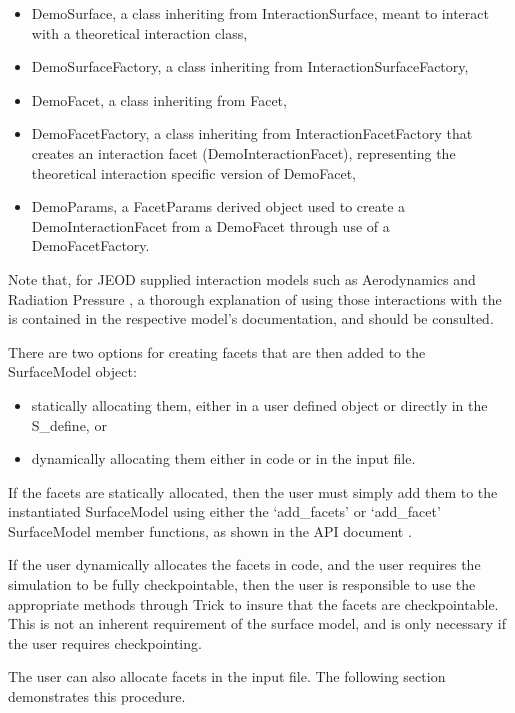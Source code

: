 \begin{itemize}
\item{DemoSurface}, a class inheriting from InteractionSurface, meant
to interact with a theoretical interaction class,
\item{DemoSurfaceFactory}, a class inheriting from InteractionSurfaceFactory,
\item{DemoFacet}, a class inheriting from Facet,
\item{DemoFacetFactory}, a class inheriting from InteractionFacetFactory
that creates an interaction facet (DemoInteractionFacet), 
representing the theoretical
interaction specific version of DemoFacet,
\item{DemoParams}, a FacetParams derived object used to create
a DemoInteractionFacet from a DemoFacet through use of a DemoFacetFactory. 
\end{itemize}

Note that, for JEOD supplied interaction models such as Aerodynamics
\cite{dynenv:AERODYNAMICS} and Radiation Pressure
\cite{dynenv:RADIATIONPRESSURE}, a thorough explanation of using
those interactions with the \ModelDesc is contained
in the respective model's documentation, and should be consulted.

There are two options for creating facets that are then added to the SurfaceModel
object:

\begin{itemize}
\item{statically allocating them, either in a user defined object or directly in
the S\_define, or}
\item{dynamically allocating them either in code or in the input file.}
\end{itemize}

If the facets are statically allocated, then the user must simply add them
to the instantiated SurfaceModel using either the
`add\_facets' or `add\_facet' SurfaceModel member functions, as shown
in the API document \cite{surfacemodelbib:ReferenceManual}.

If the user dynamically allocates the facets in code, and the user requires
the simulation to be fully checkpointable, then the user is responsible
to use the appropriate methods through Trick to insure that the facets
are checkpointable. This is not an inherent requirement of the surface model, and
is only necessary if the user requires checkpointing.

The user can also allocate facets in the input file. The following
section demonstrates this procedure.

